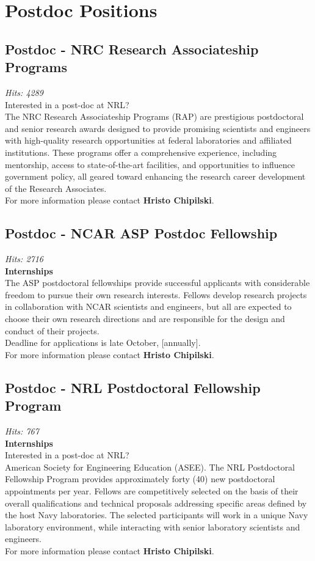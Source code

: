 \documentclass[12pt,a4paper]{article}
\begin{document}
\section{Postdoc Positions}

\subsection{Postdoc - NRC Research Associateship Programs}
\textit{Hits: 4289} \\
Interested in a post-doc at NRL? \\
The NRC Research Associateship Programs (RAP) are prestigious postdoctoral and senior research awards designed to provide promising scientists and engineers with high-quality research opportunities at federal laboratories and affiliated institutions. These programs offer a comprehensive experience, including mentorship, access to state-of-the-art facilities, and opportunities to influence government policy, all geared toward enhancing the research career development of the Research Associates. \\
For more information please contact \textbf{Hristo Chipilski}.

\subsection{Postdoc - NCAR ASP Postdoc Fellowship}
\textit{Hits: 2716} \\
\textbf{Internships} \\
The ASP postdoctoral fellowships provide successful applicants with considerable freedom to pursue their own research interests. Fellows develop research projects in collaboration with NCAR scientists and engineers, but all are expected to choose their own research directions and are responsible for the design and conduct of their projects. \\
Deadline for applications is late October, [annually]. \\
For more information please contact \textbf{Hristo Chipilski}.

\subsection{Postdoc - NRL Postdoctoral Fellowship Program}
\textit{Hits: 767} \\
\textbf{Internships} \\
Interested in a post-doc at NRL? \\
American Society for Engineering Education (ASEE). The NRL Postdoctoral Fellowship Program provides approximately forty (40) new postdoctoral appointments per year. Fellows are competitively selected on the basis of their overall qualifications and technical proposals addressing specific areas defined by the host Navy laboratories. The selected participants will work in a unique Navy laboratory environment, while interacting with senior laboratory scientists and engineers. \\
For more information please contact \textbf{Hristo Chipilski}.
\end{document}
